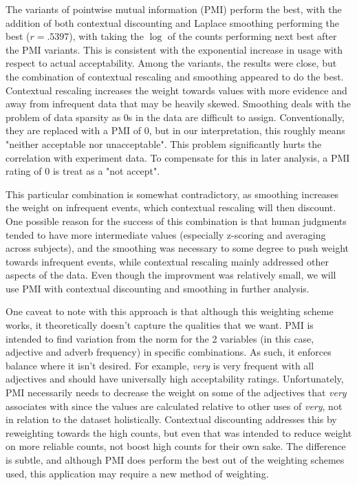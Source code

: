 \documentclass[11pt]{article}
\begin{document}
The variants of pointwise mutual information (PMI) perform the best, with the addition of both contextual discounting and Laplace smoothing performing the best ($r = .5397$), with taking the $\log$ of the counts performing next best after the PMI variants. This is consistent with the exponential increase in usage with respect to actual acceptability. Among the variants, the results were close, but the combination of contextual rescaling and smoothing appeared to do the best. Contextual rescaling increases the weight towards values with more evidence and away from infrequent data that may be heavily skewed. Smoothing deals with the problem of data sparsity as 0s in the data are difficult to assign. Conventionally, they are replaced with a PMI of 0, but in our interpretation, this roughly means "neither acceptable nor unacceptable". This problem significantly hurts the correlation with experiment data. To compensate for this in later analysis, a PMI rating of 0 is treat as a "not accept".

This particular combination is somewhat contradictory, as smoothing increases the weight on infrequent events, which contextual rescaling will then discount. One possible reason for the success of this combination is that human judgments tended to have more intermediate values (especially z-scoring and averaging across subjects), and the smoothing was necessary to some degree to push weight towards infrequent events, while contextual rescaling mainly addressed other aspects of the data. Even though the improvment was relatively small, we will use PMI with contextual discounting and smoothing in further analysis.

One caveat to note with this approach is that although this weighting scheme works, it theoretically doesn't capture the qualities that we want. PMI is intended to find variation from the norm for the 2 variables (in this case, adjective and adverb frequency) in specific combinations. As such, it enforces balance where it isn't desired. For example, \textit{very} is very frequent with all adjectives and should have universally high acceptability ratings. Unfortunately, PMI necessarily needs to decrease the weight on some of the adjectives that \textit{very} associates with since the values are calculated relative to other uses of \textit{very}, not in relation to the dataset holistically. Contextual discounting addresses this by reweighting towards the high counts, but even that was intended to reduce weight on more reliable counts, not boost high counts for their own sake. The difference is subtle, and although PMI does perform the best out of the weighting schemes used, this application may require a new method of weighting.
\end{document}
